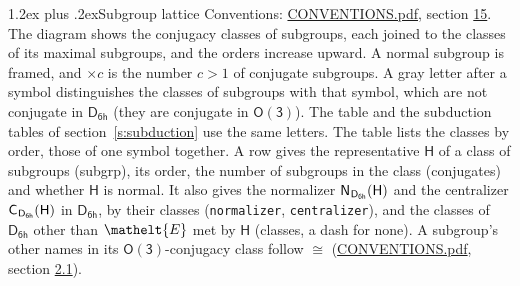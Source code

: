 \documentclass[10pt,a4paper]{article}
\makeatletter
\renewcommand\section{\@startsection{section}{1}{\z@}{-3ex plus -1ex minus -.2ex}%
  {1.2ex plus .2ex}{\normalfont\large\sffamily\bfseries\color{parttitle}}}
\numberwithin{equation}{section}
\newcommand{\eltfont}[1]{{\let\sigma\eltsigma\mathelt{#1}}}
\newcommand{\grp}[1]{\mathsf{#1}}
\newcommand{\cls}[1]{\eltfont{#1}}
\newcommand{\samecls}{\cong}
\newcommand{\hairsp}{\mkern1mu}
\makeatother
\begin{document}
\section{Subgroup lattice}\label{s:subgroups}
Conventions: \href{../../CONVENTIONS.pdf}{CONVENTIONS.pdf}, section \href{../../CONVENTIONS.pdf\#conv.15}{15}.
The diagram shows the conjugacy classes of subgroups, each joined to the classes of its maximal subgroups, and the orders increase upward. A normal subgroup is framed, and ${\times}c$ is the number $c > 1$ of conjugate subgroups. A gray letter after a symbol distinguishes the classes of subgroups with that symbol, which are not conjugate in $\grp{D_{6h}}$ (they are conjugate in \href{O3.pdf}{$\grp{O(3)}$}). The table and the subduction tables of section~\ref{s:subduction} use the same letters. The table lists the classes by order, those of one symbol together. \label{n:group.H}\label{n:head.subgroup}\label{n:head.order}\label{n:head.conjugates}\label{n:head.normal}A row gives the representative $\grp{H}$ of a class of subgroups (subgrp), its order, the number of subgroups in the class (conjugates) and whether $\grp{H}$ is normal. \label{n:group.normalizer}\label{n:group.centralizer}\label{n:head.classes}It also gives the normalizer $\grp{N}_{\hairsp \grp{D_{6h}}}(\grp{H})$ and the centralizer $\grp{C}_{\hairsp \grp{D_{6h}}}(\grp{H})$ in $\grp{D_{6h}}$, by their classes (\texttt{normalizer}, \texttt{centralizer}), and the classes of $\grp{D_{6h}}$ other than $\cls{E}$ met by $\grp{H}$ (classes, a dash for none). A subgroup's other names in its \href{O3.pdf}{$\grp{O(3)}$}-conjugacy class follow $\samecls$ (\href{../../CONVENTIONS.pdf}{CONVENTIONS.pdf}, section \href{../../CONVENTIONS.pdf\#conv.2.1}{2.1}).
\end{document}

